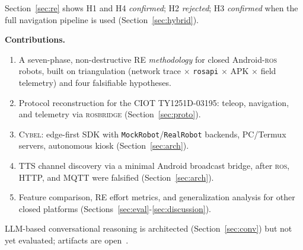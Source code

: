 \documentclass[conference]{IEEEtran}
\newcommand{\ros}{\textsc{ros}}
\newcommand{\rosbridge}{\textsc{rosbridge}}
\newcommand{\rosapi}{\texttt{rosapi}}
\newcommand{\cybel}{\textsc{Cybel}}
\begin{document}
Section~\ref{sec:re} shows H1 and H4 \emph{confirmed}; H2 \emph{rejected}; H3 \emph{confirmed} when the full navigation pipeline is used (Section~\ref{sec:hybrid}).

\textbf{Contributions.}
\begin{enumerate}[label=\textbf{C\arabic*.},leftmargin=1.4em]
\item A seven-phase, non-destructive RE \emph{methodology} for closed Android-\ros{} robots, built on triangulation (network trace $\times$ \rosapi{} $\times$ APK $\times$ field telemetry) and four falsifiable hypotheses.
\item Protocol reconstruction for the CIOT TY1251D-03195: teleop, navigation, and telemetry via \rosbridge{} (Section~\ref{sec:proto}).
\item \cybel{}: edge-first SDK with \texttt{MockRobot}/\texttt{RealRobot} backends, PC/Termux servers, autonomous kiosk (Section~\ref{sec:arch}).
\item TTS channel discovery via a minimal Android broadcast bridge, after \ros{}, HTTP, and MQTT were falsified (Section~\ref{sec:arch}).
\item Feature comparison, RE effort metrics, and generalization analysis for other closed platforms (Sections~\ref{sec:eval}-\ref{sec:discussion}).
\end{enumerate}

LLM-based conversational reasoning is architected (Section~\ref{sec:conv}) but not yet evaluated; artifacts are open~\cite{cybel2026}.
\end{document}
